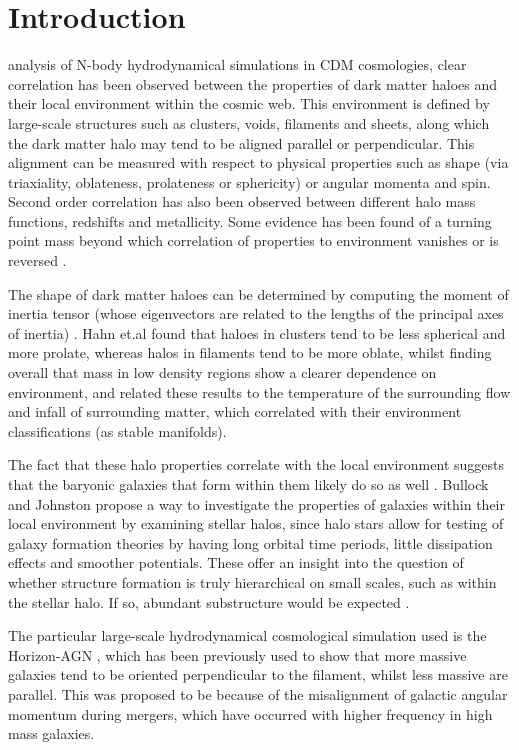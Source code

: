 \documentclass[journal]{IEEEtran}
\begin{document}
\section{Introduction}
 analysis of N-body hydrodynamical simulations in CDM cosmologies, clear correlation has been observed between the properties of dark matter haloes and their local environment within the cosmic web. This environment is defined by large-scale structures such as clusters, voids, filaments and sheets, along which the dark matter halo may tend to be aligned parallel or perpendicular. This alignment can be measured with respect to physical properties such as shape (via triaxiality, oblateness, prolateness or sphericity) or angular momenta and spin. Second order correlation has also been observed between different halo mass functions, redshifts and metallicity. Some evidence has been found of a turning point mass beyond which correlation of properties to environment vanishes or is reversed \cite{hahn07b} \cite{dubois14}. 

The shape of dark matter haloes can be determined by computing the moment of inertia tensor (whose eigenvectors are related to the lengths of the principal axes of inertia) \cite{hahn07a}. Hahn et.al \cite{hahn07a} found that haloes in clusters tend to be less spherical and more prolate, whereas halos in filaments tend to be more oblate, whilst finding overall that mass in low density regions show a clearer dependence on environment, and related these results to the temperature of the surrounding flow and infall of surrounding matter, which correlated with their environment classifications (as stable manifolds). 

The fact that these halo properties correlate with the local environment suggests that the baryonic galaxies that form within them likely do so as well \cite{hahn07b}.  Bullock and Johnston \cite{bullock05} propose a way to investigate the properties of galaxies within their local environment by examining stellar halos, since halo stars allow for testing of galaxy formation theories by having long orbital time periods, little dissipation effects and smoother potentials. These offer an insight into the question of whether structure formation is truly hierarchical on small scales, such as within the stellar halo. If so, abundant substructure would be expected \cite{bullock05}. 

The particular large-scale hydrodynamical cosmological simulation used is the Horizon-AGN \cite{dubois14}, which has been previously used to show that more massive galaxies tend to be oriented perpendicular to the filament, whilst less massive are parallel. This was proposed to be because of the misalignment of galactic angular momentum during mergers, which have occurred with higher frequency in high mass galaxies. 
\end{document}
